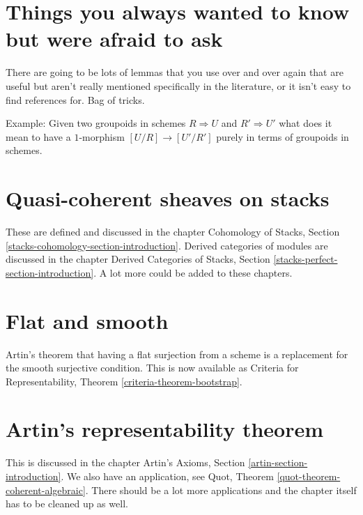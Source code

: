 \section{Things you always wanted to know but were afraid to ask}
\label{section-stacks-fun-lemmas}

\noindent
There are going to be lots of lemmas that you use over and over again
that are useful but aren't really mentioned specifically in the literature,
or it isn't easy to find references for. Bag of tricks.

\medskip\noindent
Example: Given two groupoids in schemes $R\Rightarrow U$ and
$R' \Rightarrow U'$ what does it mean to have a $1$-morphism
$[U/R] \to [U'/R']$ purely in terms of groupoids in schemes.



\section{Quasi-coherent sheaves on stacks}
\label{section-quasi-coherent}

\noindent
These are defined and discussed in the chapter
Cohomology of Stacks, Section \ref{stacks-cohomology-section-introduction}.
Derived categories of modules are discussed in the chapter
Derived Categories of Stacks, Section \ref{stacks-perfect-section-introduction}.
A lot more could be added to these chapters.



\section{Flat and smooth}
\label{section-flat-smooth}

\noindent
Artin's theorem that having a flat surjection from a scheme is a replacement
for the smooth surjective condition. This is now available as
Criteria for Representability, Theorem \ref{criteria-theorem-bootstrap}.


\section{Artin's representability theorem}
\label{section-representability}

\noindent
This is discussed in the chapter
Artin's Axioms, Section \ref{artin-section-introduction}.
We also have an application, see
Quot, Theorem \ref{quot-theorem-coherent-algebraic}.
There should be a lot more applications and the chapter
itself has to be cleaned up as well.


